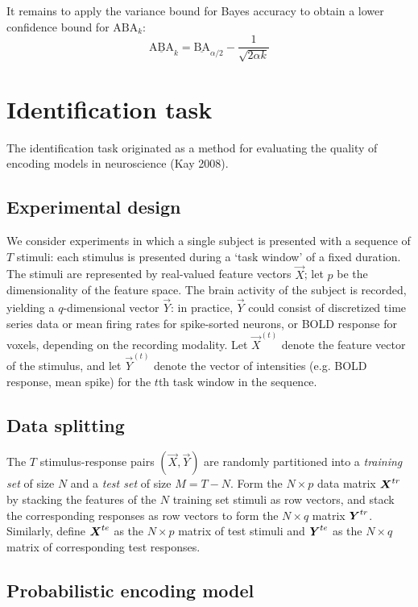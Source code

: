 It remains to apply the variance bound for Bayes accuracy to obtain a lower confidence bound for $\text{ABA}_k$:
\[
\underline{\text{ABA}}_k = \underline{\text{BA}}_{\alpha/2} -  \frac{1}{\sqrt{2\alpha k}}
\]


\section{Identification task}

The identification task originated as a method for evaluating the quality of encoding models in neuroscience (Kay 2008).

\subsection{Experimental design}

We consider experiments in which a single subject is presented with a
sequence of $T$ stimuli: each stimulus is presented during a `task
window' of a fixed duration.  The stimuli are represented by
real-valued feature vectors $\vec{X}$; let $p$ be the dimensionality of
the feature space.  The brain activity of the subject is recorded,
yielding a $q$-dimensional vector $\vec{Y}$: in practice, $\vec{Y}$ could
consist of discretized time series data or mean firing rates for
spike-sorted neurons, or BOLD response for voxels, depending on the
recording modality.  Let $\vec{X}^{(t)}$ denote the feature vector of the
stimulus, and let $\vec{Y}^{(t)}$ denote the vector of intensities
(e.g. BOLD response, mean spike) for the $t$th task window in the
sequence.

\subsection{Data splitting}

The $T$ stimulus-response pairs $(\vec{X}, \vec{Y})$ are randomly
partitioned into a \emph{training set} of size $N$ and a \emph{test
set} of size $M = T-N$.  Form the $N \times p$ data matrix $\boldsymbol{X}^{tr}$
by stacking the features of the $N$ training set stimuli as row
vectors, and stack the corresponding responses as row vectors to form
the $N \times q$ matrix $\boldsymbol{Y}^{tr}$.  Similarly, define $\boldsymbol{X}^{te}$ as
the $N \times p$ matrix of test stimuli and $\boldsymbol{Y}^{te}$ as the
$N \times q$ matrix of corresponding test responses.

\subsection{Probabilistic encoding model}

